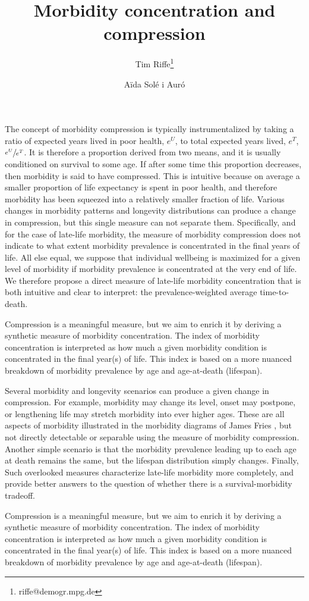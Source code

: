 \documentclass{article}
\begin{document}
\title{Morbidity concentration and compression}

\author[1]{Tim Riffe\thanks{riffe@demogr.mpg.de}}
\author[2]{A{\"i}da Sol\'{e} i Aur\'{o}}

\maketitle

The concept of morbidity compression is typically instrumentalized by taking a
ratio of expected years lived in poor health, $e^U$, to total expected years lived,
$e^T$, $\sfrac{e^U}{e^T}$. It is therefore a proportion derived from two means,
and it is usually conditioned on survival to some age. If after some time this
proportion decreases, then morbidity is said to have compressed. This is
intuitive because on average a smaller proportion of life expectancy is spent in
poor health, and therefore morbidity has been squeezed into a relatively smaller
fraction of life. Various changes in morbidity patterns and longevity
distributions can produce a change in compression, but this single
measure can not separate them. Specifically, and for the case of late-life morbidity, the measure of
morbidity compression does not indicate to what extent morbidity prevalence is
concentrated in the final years of life. All else equal, we suppose that
individual wellbeing is maximized for a given level of morbidity if
morbidity prevalence is concentrated at the very end of life. We therefore
propose a direct measure of late-life morbidity concentration that is both intuitive and clear to interpret: the prevalence-weighted average time-to-death.

Compression is a meaningful measure, but we aim to enrich it by deriving a
synthetic measure of morbidity concentration. The index of morbidity
concentration is interpreted as how much a given morbidity condition is
concentrated in the final year(s) of life. This index is based on a more
nuanced breakdown of morbidity prevalence by age and age-at-death (lifespan). 


Several morbidity and longevity scenarios can produce a given change in 
compression. For example, morbidity may change its level, onset may
postpone, or lengthening life may stretch morbidity into ever
higher ages. These are all aspects of morbidity illustrated in the morbidity
diagrams of James Fries \citep[e.g.,][]{fries2003measuring}, but not directly detectable
or separable using the measure of morbidity compression. Another simple scenario
is that the morbidity prevalence leading up to each age at death remains the
same, but the lifespan distribution simply changes. Finally,   Such overlooked measures
characterize late-life morbidity more completely, and provide better answers to the question of whether there is a survival-morbidity tradeoff.

Compression is a meaningful measure, but we aim to enrich it by deriving a
synthetic measure of morbidity concentration. The index of morbidity
concentration is interpreted as how much a given morbidity condition is
concentrated in the final year(s) of life. This index is based on a more
nuanced breakdown of morbidity prevalence by age and age-at-death (lifespan). 
\end{document}
